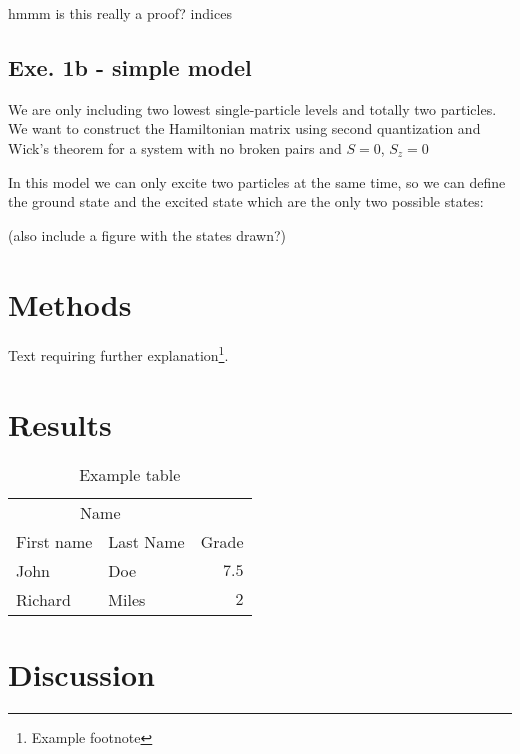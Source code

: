 \documentclass[twoside]{article}
\begin{document}
hmmm is this really a proof? indices

\subsection{ Exe. 1b - simple model}

We are only including two lowest single-particle levels and totally two particles.  We want to construct the Hamiltonian matrix using second quantization and Wick’s theorem for a system with no broken pairs and $S=0$, $S_z=0$

In this model we can only excite two particles at the same time, so we can define the ground state and the excited state which are the only two possible states:

(also include a figure with the states drawn?)






\section{Methods}



Text requiring further explanation\footnote{Example footnote}.


\section{Results}

\begin{table}
\caption{Example table}
\centering
\begin{tabular}{llr}
\toprule
\multicolumn{2}{c}{Name} \\
\cmidrule(r){1-2}
First name & Last Name & Grade \\
\midrule
John & Doe & $7.5$ \\
Richard & Miles & $2$ \\
\bottomrule
\end{tabular}
\end{table}





\section{Discussion}
\end{document}
